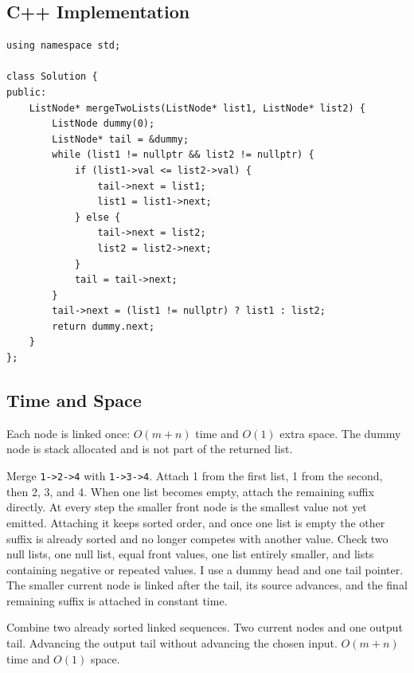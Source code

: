 \subsection{C++ Implementation}
\begin{lstlisting}[style=compactcode,caption={Complete C++ solution: Merge Two Sorted Lists}]
using namespace std;

class Solution {
public:
    ListNode* mergeTwoLists(ListNode* list1, ListNode* list2) {
        ListNode dummy(0);
        ListNode* tail = &dummy;
        while (list1 != nullptr && list2 != nullptr) {
            if (list1->val <= list2->val) {
                tail->next = list1;
                list1 = list1->next;
            } else {
                tail->next = list2;
                list2 = list2->next;
            }
            tail = tail->next;
        }
        tail->next = (list1 != nullptr) ? list1 : list2;
        return dummy.next;
    }
};
\end{lstlisting}

\subsection{Time and Space}
Each node is linked once: \(O(m+n)\) time and \(O(1)\) extra space. The
dummy node is stack allocated and is not part of the returned list.

\lessonexpansion
  {Merge \texttt{1->2->4} with \texttt{1->3->4}. Attach 1 from the first
   list, 1 from the second, then 2, 3, and 4. When one list becomes empty,
   attach the remaining suffix directly.}
  {At every step the smaller front node is the smallest value not yet emitted.
   Attaching it keeps sorted order, and once one list is empty the other
   suffix is already sorted and no longer competes with another value.}
  {Check two null lists, one null list, equal front values, one list entirely
   smaller, and lists containing negative or repeated values.}
  {I use a dummy head and one tail pointer. The smaller current node is linked
   after the tail, its source advances, and the final remaining suffix is
   attached in constant time.}

\chaptercheckpoint
  {Combine two already sorted linked sequences.}
  {Two current nodes and one output tail.}
  {Advancing the output tail without advancing the chosen input.}
  {$O(m+n)$ time and $O(1)$ space.}



